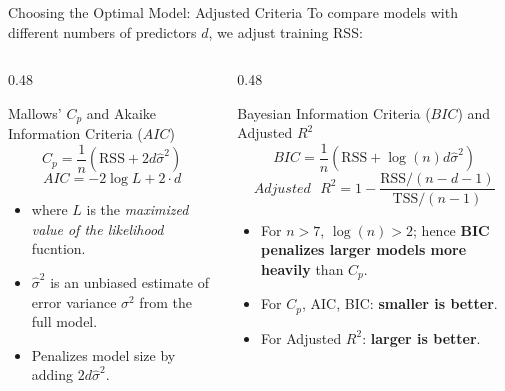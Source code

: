 \documentclass[aspectratio=169, 11pt]{beamer}
\begin{document}
\begin{frame}{Choosing the Optimal Model: Adjusted Criteria}
    To compare models with different numbers of predictors $d$, we adjust training RSS:
    \begin{columns}[T]
        \begin{column}{0.48\textwidth}
            \begin{block}{Mallows' $C_p$ and Akaike Information Criteria ($AIC$)}
                \[
                    C_p = \frac{1}{n}\left(\text{RSS} + 2d\hat{\sigma}^2\right)
                \]
                \[
                    AIC = -2 \log{L} + 2 \cdot d
                \]
                \begin{itemize}
                    \small
                    \item where $L$ is the \textit{maximized value of the likelihood} fucntion.
                    \item $\hat{\sigma}^2$ is an unbiased estimate of error variance $\sigma^2$ from the full model.
                    \item Penalizes model size by adding $2d\hat{\sigma}^2$.
                \end{itemize}
            \end{block}
        \end{column}

        \begin{column}{0.48\textwidth}
            \begin{block}{Bayesian Information Criteria ($BIC$)  and Adjusted $R^2$}
                \[
                    BIC = \frac{1}{n}\left(\text{RSS} + \log(n)d\hat{\sigma}^2\right)
                \]
                \[
                    Adjusted \text{ } R^2 = 1 - \frac{\text{RSS}/(n-d-1)}{\text{TSS}/(n-1)}
                \]
                \begin{itemize}
                    \small
                    \item For $n > 7$, $\log(n) > 2$; hence \textbf{BIC penalizes larger models more heavily} than $C_p$.
                    \item For $C_p$, AIC, BIC: \textbf{smaller is better}.
                    \item For Adjusted $R^2$: \textbf{larger is better}.
                \end{itemize}
            \end{block}
        \end{column}
    \end{columns}
\end{frame}
\end{document}
